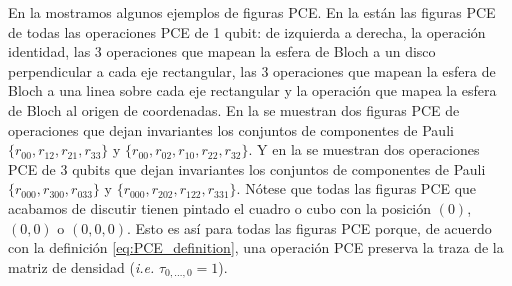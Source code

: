 
En la  mostramos algunos ejemplos de figuras PCE. 
En la  están las figuras PCE de todas 
las operaciones PCE de 1 qubit: de izquierda a derecha, la operación identidad, las 
3 operaciones que mapean la esfera de Bloch a un disco perpendicular a cada
eje rectangular, las 3 operaciones que mapean la esfera de Bloch a una linea
sobre cada eje rectangular y la operación que mapea la esfera 
de Bloch al origen de coordenadas. En la 
se muestran dos figuras PCE de operaciones que dejan invariantes
los conjuntos de componentes de Pauli $\{r_{00},r_{12},r_{21},r_{33}\}$ y 
$\{r_{00},r_{02},r_{10},r_{22},r_{32}\}$. Y en la 
 se muestran dos operaciones PCE de 3 qubits
que dejan invariantes los conjuntos de componentes de Pauli $\{r_{000},
r_{300}, r_{033}\}$ y $\{r_{000},r_{202},r_{122}, r_{331}\}$.
Nótese que todas las figuras PCE que acabamos de discutir  
tienen pintado el cuadro o cubo con la posición $(0)$, $(0,0)$ o $(0,0,0)$.
Esto es así para todas las figuras PCE porque, de acuerdo con la definición 
\eqref{eq:PCE_definition}, una operación PCE preserva la traza de 
la matriz de densidad (\textit{i.e.} $\tau_{0,\ldots,0}=1$).
